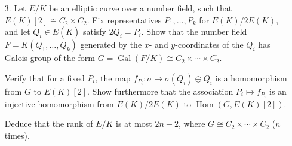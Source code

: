 \documentclass[a4paper]{article}
\theoremstyle{definition}
\DeclareMathOperator{\Hom}{Hom}
\DeclareMathOperator{\Gal}{Gal}
\begin{document}
\begin{enumerate}
\begin{proof}[Solution]
\begin{align*}
                    &\le 2^{2n+1}\cdot\max_{a\in S}\bigl(h(a)+C-h(0)\bigr)
                        + 2^{n+1}(h(x)+C),
            \end{align*}
            noting that $h(a_0)\le h(a_0)+C-h(0)$ since $|2h(0)-4h(0)|\le C$
            implies $h(0)\le\frac{C}{2}$. Hence
            \begin{align*}
                h(y)
                    &\le 4^{-n-1}h(2^{n+1}y) + h(0) + C \\
                    &\le 2^{-1}\cdot\max_{a\in S}\bigl(h(a)+C-h(0)\bigr)
                        + 2^{-n-1}(h(x)+C),
            \end{align*}
            so for $n$ large enough we have
            \begin{equation*}
                h(y) \le 2^{-1}\cdot\max_{a\in S}\bigl(h(a)+C-h(0)\bigr) + 1.
            \end{equation*}
            Now the set $T\subseteq A$ of $y$ satisfying this inequality is
            finite, and since $f$ is a linear combination of
            $a_0,a_1,\ldots\in S$ and $y\in T$, we see that the finite set
            $S\cup T$ generates $A$.
        \end{proof}

    \item[3.] Let $E/K$ be an elliptic curve over a number field, such that
        $E(K)[2]\cong C_2\times C_2$. Fix representatives $P_1,\ldots,P_k$ for
        $E(K)/2E(K)$, and let $Q_i\in E(\bar K)$ satisfy $2Q_i=P_i$. Show that
        the number field $F=K(Q_1,\ldots,Q_k)$ generated by the $x$- and
        $y$-coordinates of the $Q_i$ has Galois group of the form
        $G=\Gal(F/K)\cong C_2\times\cdots\times C_2$.

        Verify that for a fixed $P_i$, the map
        $f_{P_i}:\sigma\mapsto\sigma(Q_i)\ominus Q_i$ is a homomorphism from $G$
        to $E(K)[2]$. Show furthermore that the association $P_i\mapsto f_{P_i}$
        is an injective homomorphism from $E(K)/2E(K)$ to $\Hom(G,E(K)[2])$.

        Deduce that the rank of $E/K$ is at most $2n-2$, where
        $G\cong C_2\times\cdots\times C_2$ ($n$ times).


\end{enumerate}
\end{document}
